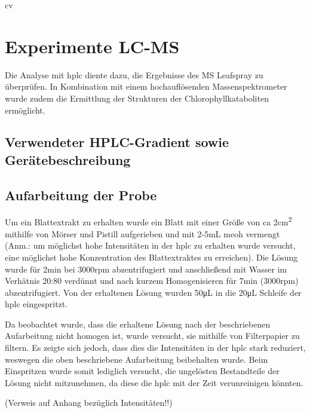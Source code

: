 cv\chapter{Experimente LC-MS} 

Die Analyse mit \gls{hplc} diente dazu, die Ergebnisse des MS Leafspray zu überprüfen. In Kombination mit einem hochauflösenden Massenspektrometer wurde zudem die Ermittlung der Strukturen der Chlorophyllkataboliten ermöglicht. \\

\section{Verwendeter HPLC-Gradient sowie Gerätebeschreibung}

\section{Aufarbeitung der Probe} \label{sec:HPLCAufarbeitungderProbe}

Um ein Blattextrakt zu erhalten wurde ein Blatt mit einer Größe von \gls{ca} 2\si{cm^{2}} mithilfe von Mörser und Pistill aufgerieben und mit 2-5mL \gls{meoh} vermengt (Anm.: um möglichst hohe Intensitäten in der \gls{hplc} zu erhalten wurde versucht, eine möglichst hohe Konzentration des Blattextraktes zu erreichen). Die Lösung wurde für 2min bei 3000rpm abzentrifugiert und anschließend mit Wasser im Verhätnis 20:80 verdünnt und nach kurzem Homogenisieren für 7min (3000rpm) abzentrifugiert. Von der erhaltenen Lösung wurden 50\si{\uL} in die 20\si{\uL} Schleife der \gls{hplc} eingespritzt. 

Da beobachtet wurde, dass die erhaltene Lösung nach der beschriebenen Aufarbeitung nicht homogen ist, wurde versucht, sie mithilfe von Filterpapier zu filtern. Es zeigte sich jedoch, dass dies die Intensitäten in der \gls{hplc} stark reduziert, weswegen die oben beschriebene Aufarbeitung beibehalten wurde. Beim Einspritzen wurde somit lediglich versucht, die ungelösten Bestandteile der Lösung nicht mitzunehmen, da diese die \gls{hplc} mit der Zeit verunreinigen könnten.

(Verweis auf Anhang bezüglich Intensitäten!!)



